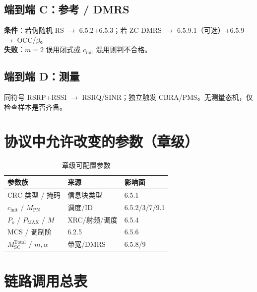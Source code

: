 \documentclass[11pt,a4paper]{ctexart}
\begin{document}
\subsection{端到端 C：参考 / DMRS}

\textbf{条件}：若伪随机 RS $\rightarrow$ 6.5.2+6.5.3；若 ZC DMRS $\rightarrow$ 6.5.9.1（可选）+6.5.9 $\rightarrow$ OCC/$β$。\\
\textbf{失败}：$m{=}2$ 误用闭式或 $c_{\mathrm{init}}$ 混用则判不合格。

\subsection{端到端 D：测量}

同符号 RSRP+RSSI $\rightarrow$ RSRQ/SINR；独立触发 CBRA/PMS。无测量态机，仅检查样本是否齐备。

\section{协议中允许改变的参数（章级）}

\begin{longtable}{L{4.5cm}L{4cm}L{5.5cm}}
\caption{章级可配置参数\label{tab:65-tunable}} \\
\toprule
\textbf{参数族} & \textbf{来源} & \textbf{影响面} \\
\midrule
CRC 类型 / 掩码 & 信息块类型 & 6.5.1 \\
$c_{\mathrm{init}}$ / $M_{\mathrm{PN}}$ & 调度/ID & 6.5.2/3/7/9.1 \\
$P_o$ / $P_{\mathrm{MAX}}$ / $M$ & XRC/射频/调度 & 6.5.4 \\
MCS / 调制阶 & 6.2.5 & 6.5.6 \\
$M_{\mathrm{SC}}^{\mathrm{Total}}$ / $m,\alpha$ & 带宽/DMRS & 6.5.8/9 \\
\bottomrule
\end{longtable}

\section{链路调用总表}
\end{document}
